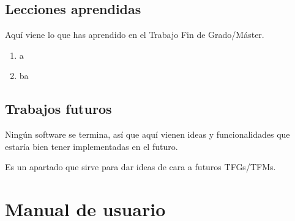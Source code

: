 \documentclass[a4paper, 12pt]{book}
\begin{document}
\section{Lecciones aprendidas}
\label{sec:lecciones_aprendidas}

Aquí viene lo que has aprendido en el Trabajo Fin de Grado/Máster.

\begin{enumerate}
  \item a
  \item ba
\end{enumerate}


\section{Trabajos futuros}
\label{sec:trabajos_futuros}

Ningún software se termina, así que aquí vienen ideas y funcionalidades
que estaría bien tener implementadas en el futuro.

Es un apartado que sirve para dar ideas de cara a futuros TFGs/TFMs.



\cleardoublepage
\appendix
\chapter{Manual de usuario}
\label{app:manual}



\cleardoublepage


\end{document}
